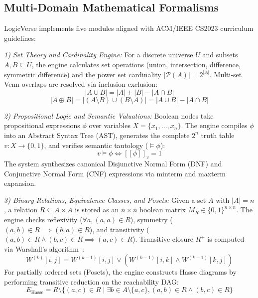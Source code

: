 \documentclass[conference]{IEEEtran}
\begin{document}
\subsection{Multi-Domain Mathematical Formalisms}
LogicVerse implements five modules aligned with ACM/IEEE CS2023 curriculum guidelines:

\textit{1) Set Theory and Cardinality Engine:} For a discrete universe $U$ and subsets $A, B \subseteq U$, the engine calculates set operations (union, intersection, difference, symmetric difference) and the power set cardinality $|\mathcal{P}(A)| = 2^{|A|}$. Multi-set Venn overlaps are resolved via inclusion-exclusion:
\begin{equation}
|A \cup B| = |A| + |B| - |A \cap B|
\end{equation}
\begin{equation}
|A \oplus B| = |(A \setminus B) \cup (B \setminus A)| = |A \cup B| - |A \cap B|
\end{equation}

\textit{2) Propositional Logic and Semantic Valuations:} Boolean nodes take propositional expressions $\phi$ over variables $X = \{x_1, \dots, x_n\}$. The engine compiles $\phi$ into an Abstract Syntax Tree (AST), generates the complete $2^n$ truth table $v: X \to \{0, 1\}$, and verifies semantic tautology ($\models \phi$):
\begin{equation}
v \models \phi \iff [[\phi]]_v = 1
\end{equation}
The system synthesizes canonical Disjunctive Normal Form (DNF) and Conjunctive Normal Form (CNF) expressions via minterm and maxterm expansion.

\textit{3) Binary Relations, Equivalence Classes, and Posets:} Given a set $A$ with $|A| = n$, a relation $R \subseteq A \times A$ is stored as an $n \times n$ boolean matrix $M_R \in \{0, 1\}^{n \times n}$. The engine checks reflexivity ($\forall a, (a,a) \in R$), symmetry ($(a,b) \in R \implies (b,a) \in R$), and transitivity ($(a,b) \in R \land (b,c) \in R \implies (a,c) \in R$). Transitive closure $R^+$ is computed via Warshall's algorithm~\cite{warshall1962}:
\begin{equation}
W^{(k)}[i,j] = W^{(k-1)}[i,j] \lor (W^{(k-1)}[i,k] \land W^{(k-1)}[k,j])
\end{equation}
For partially ordered sets (Posets), the engine constructs Hasse diagrams by performing transitive reduction on the reachability DAG:
\begin{equation}
E_{\text{Hasse}} = R \setminus \{(a, c) \in R \mid \exists b \in A \setminus \{a, c\}, (a,b) \in R \land (b,c) \in R\}
\end{equation}
\end{document}
